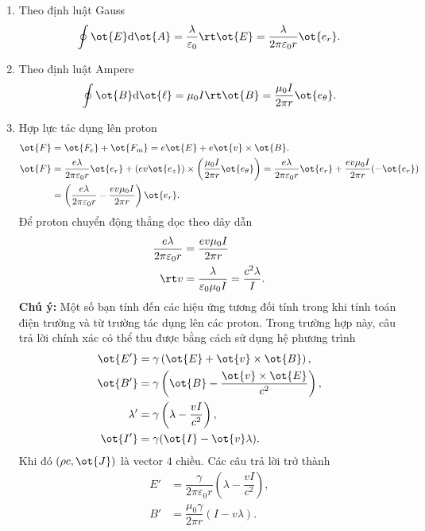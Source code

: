 \begin{loigiai}
\begin{enumerate}[1)]
    \item Theo định luật Gauss
    \[\oint \ot{E}\mathrm{d}\ot{A}=\dfrac{\lambda}{\varepsilon_0}\rt\ot{E}=\dfrac{\lambda}{2\pi\varepsilon_0r}\ot{e_{r}}.\]
    \item Theo định luật Ampere
    \[\oint \ot{B}\mathrm{d}\ot{\ell}=\mu_0I\rt \ot{B}=\dfrac{\mu_0I}{2\pi r}\ot{e_{\theta}}.\]
    \item Hợp lực tác dụng lên proton
    \begin{align*}
       \ot{F}&=\ot{F_{e}}+\ot{F_{m}}=e\ot{E}+e\ot{v}\times\ot{B}.\\
       \ot{F}&=\dfrac{e\lambda}{2\pi\varepsilon_0r}\ot{e_{r}}+(ev\ot{e_{z}})\times\left(\dfrac{\mu_0I}{2\pi r}\ot{e_{\theta}}\right)=\dfrac{e\lambda}{2\pi\varepsilon_0r}\ot{e_{r}}+\dfrac{ev\mu_0I}{2\pi r}(-\ot{e_{r}})\\
       &=\left(\dfrac{e\lambda}{2\pi\varepsilon_0r}-\dfrac{ev\mu_0I}{2\pi r}\right)\ot{e_{r}}.
    \end{align*}
    Để proton chuyển động thẳng dọc theo dây dẫn
    \begin{align*}
        \dfrac{e\lambda}{2\pi\varepsilon_0r}&=\dfrac{ev\mu_0I}{2\pi r}\\
        \rt v&=\dfrac{\lambda}{\varepsilon_0\mu_0I}=\dfrac{c^2\lambda}{I}.
    \end{align*}
    \textbf{Chú ý:} Một số bạn tính đến các hiệu ứng tương đối tính trong khi tính toán điện trường và từ trường tác dụng lên các proton. Trong trường hợp này, câu trả lời chính xác có thể thu được bằng cách sử dụng hệ phương trình
    \begin{align*}
        \ot{E'}&=\gamma\left(\ot{E}+\ot{v}\times\ot{B}\right),\\
        \ot{B'}&=\gamma\left(\ot{B}-\dfrac{\ot{v}\times\ot{E}}{c^2}\right),\\
        \lambda'&=\gamma\left(\lambda-\dfrac{vI}{c^2}\right),\\
        \ot{I'}&=\gamma(\ot{I}-\ot{v}\lambda).
    \end{align*}
    Khi đó $(\rho c,\ot{J})$ là vector $4$ chiều. Các câu trả lời trở thành
    \begin{align*}
        E'&=\dfrac{\gamma}{2\pi\varepsilon_0r}\left(\lambda-\dfrac{vI}{c^2}\right),\\
        B'&=\dfrac{\mu_0\gamma}{2\pi r}(I-v\lambda).
    \end{align*}
\end{enumerate}
\end{loigiai}


